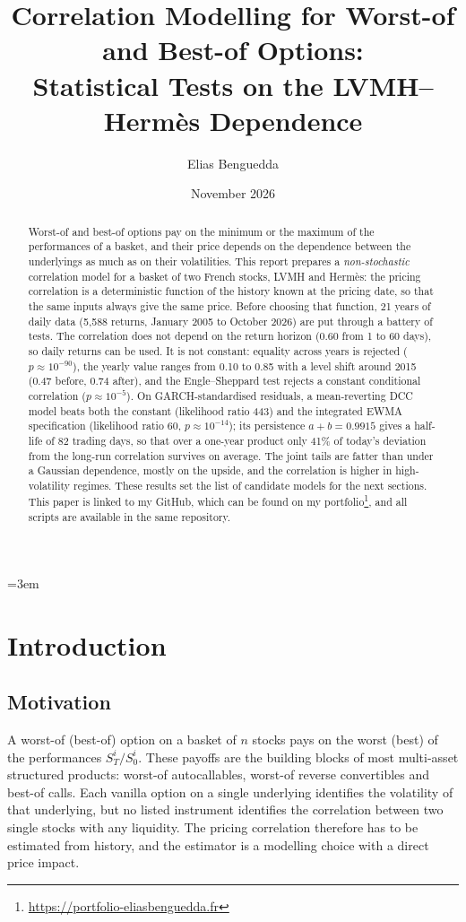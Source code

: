 \documentclass[11pt,a4paper]{article}
\title{Correlation Modelling for Worst-of and Best-of Options:\\
Statistical Tests on the LVMH--Hermès Dependence}
\author{Elias Benguedda}
\date{November 2026}
\begin{document}
\emergencystretch=3em
\maketitle

\begin{abstract}
Worst-of and best-of options pay on the minimum or the maximum of the performances of a basket, and their price
depends on the dependence between the underlyings as much as on their volatilities. This report prepares a
\emph{non-stochastic} correlation model for a basket of two French stocks, LVMH and Hermès: the pricing correlation
is a deterministic function of the history known at the pricing date, so that the same inputs always give the same
price. Before choosing that function, 21 years of daily data (5{,}588 returns, January 2005 to October 2026) are put
through a battery of tests. The correlation does not depend on the return horizon (0.60 from 1 to 60 days), so daily
returns can be used. It is not constant: equality across years is rejected ($p \approx 10^{-90}$), the yearly value
ranges from 0.10 to 0.85 with a level shift around 2015 (0.47 before, 0.74 after), and the Engle--Sheppard test
rejects a constant conditional correlation ($p \approx 10^{-5}$). On GARCH-standardised residuals, a mean-reverting
DCC model beats both the constant (likelihood ratio 443) and the integrated EWMA specification (likelihood ratio 60,
$p \approx 10^{-14}$); its persistence $a + b = 0.9915$ gives a half-life of 82 trading days, so that over a one-year
product only 41\% of today's deviation from the long-run correlation survives on average. The joint tails are fatter
than under a Gaussian dependence, mostly on the upside, and the correlation is higher in high-volatility regimes.
These results set the list of candidate models for the next sections. This paper is linked to my GitHub, which can be
found on my portfolio\footnote{\url{https://portfolio-eliasbenguedda.fr}}, and all scripts are available in the same
repository.
\end{abstract}

\tableofcontents
\newpage

\section{Introduction}\label{sec:intro}

\subsection{Motivation}
A worst-of (best-of) option on a basket of $n$ stocks pays on the worst (best) of the performances
$S^i_T / S^i_0$. These payoffs are the building blocks of most multi-asset structured products: worst-of
autocallables, worst-of reverse convertibles and best-of calls. Each vanilla option on a single underlying
identifies the volatility of that underlying, but no listed instrument identifies the correlation between two single
stocks with any liquidity. The pricing correlation therefore has to be estimated from history, and the estimator is
a modelling choice with a direct price impact.
\end{document}
